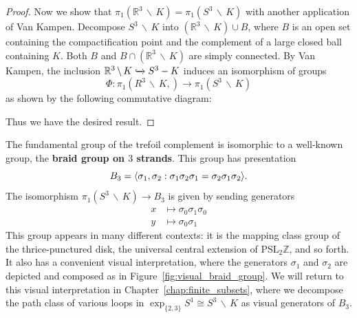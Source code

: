 \documentclass[12pt,twoside]{reedthesis}
\theoremstyle{definition}
\newcommand{\Z}{\mathbb{Z}}
\newcommand{\R}{\mathbb{R}}
\newcommand{\PSLZ}{\mathrm{PSL}_2{\Z}}
\newcommand{\exptwothree}{\exp_{\{2,3\}}}
\newcommand{\into}{\xhookrightarrow{}}
\newcommand{\wo}{\, \backslash \,}
\newcommand{\defnphrase}[1]{\textbf{#1}}
\DeclarePairedDelimiter\ang{\langle}{\rangle}
\begin{document}
\begin{proof}
  Now we show that $\pi_1(\R^3 \wo K) = \pi_1(S^3 \wo K)$ with another application of Van Kampen.
  Decompose $S^3 \wo K$ into $(\R^3 \wo K) \cup B$, where $B$ is an open set containing the compactification point and the complement of a large closed ball containing $K$.
  Both $B$ and $B \cap (\R^3 \wo K)$ are simply connected.
  By Van Kampen, the inclusion $\R^3 \wo K \into S^3 - K$ induces an isomorphism of groups
  \begin{equation*}
    \Phi : \pi_1(R^3 \wo K,) \to \pi_1(S^3 \wo K)
  \end{equation*}
  as shown by the following commutative diagram:
  \begin{center}
  \end{center}
  Thus we have the desired result.
\end{proof}

The fundamental group of the trefoil complement is isomorphic to a well-known group, the \defnphrase{braid group on $3$ strands}.
This group has presentation
\begin{equation*}
  B_3 = \ang{\sigma_1, \sigma_2 : \sigma_1 \sigma_2 \sigma_1 = \sigma_2 \sigma_1 \sigma_2}.
\end{equation*}
The isomorphism $\pi_1(S^3 \wo K) \to B_3$ is given by sending generators
\begin{equation}\label{eq:iso_pi1_b3}
  \begin{aligned}
    x &\mapsto \sigma_0 \sigma_1 \sigma_0 \\
    y &\mapsto \sigma_0 \sigma_1
  \end{aligned}
\end{equation}
This group appears in many different contexts: it is the mapping class group of the thrice-punctured disk, the universal central extension of $\PSLZ$, and so forth.
It also has a convenient visual interpretation, where the generators $\sigma_1$ and $\sigma_2$ are depicted and composed as in Figure~\ref{fig:visual_braid_group}.
We will return to this visual interpretation in Chapter~\ref{chap:finite_subsets}, where we decompose the path class of various loops in $\exptwothree S^1 \cong S^3 \wo K$ as visual generators of $B_3$. 
\end{document}
